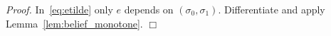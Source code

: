 \noindent\textit{Proof.} In~\eqref{eq:etilde} only $e$ depends on $(\sigma_0,\sigma_1)$. Differentiate and apply Lemma~\ref{lem:belief_monotone}. $\Box$
